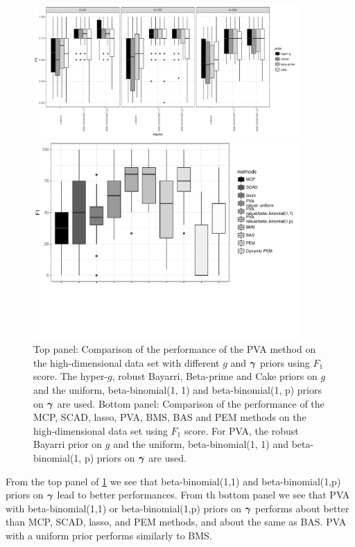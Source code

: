 \begin{figure}[p!]
	\begin{center}
		\includegraphics[width=0.9\textwidth]{./highDimPVA_F1.pdf}  
		
		\includegraphics[trim={0 4cm 0 0},width=0.9\textwidth]{./highDimPVA_F1_compare_edit.pdf} 
	\end{center}
	\caption{Top panel: Comparison of the performance of the PVA method on the
						high-dimensional data set with different $g$ and ${\boldsymbol \gamma}$ priors using $F_1$ score.
						The hyper-$g$,
						robust Bayarri, Beta-prime and Cake priors on $g$ and the uniform, beta-binomial(1, 1) and beta-binomial(1, p) priors on ${\boldsymbol \gamma}$ are used.
					Bottom panel: Comparison of the performance of the MCP, SCAD, lasso, PVA, BMS, BAS and PEM methods on the
					high-dimensional data set using $F_1$ score. For PVA, the
					robust Bayarri prior on $g$ and the uniform, beta-binomial(1, 1) and beta-binomial(1, p) priors
					on ${\boldsymbol \gamma}$ are used.}
	\label{fig:highDimPVA_F1}
\end{figure}

From the top panel of \ref{fig:highDimPVA_F1} we see that 
beta-binomial(1,1) and beta-binomial(1,p) priors on ${\boldsymbol \gamma}$
lead to better performances.
From th bottom panel we see that PVA 
with beta-binomial(1,1) or beta-binomial(1,p) priors on ${\boldsymbol \gamma}$
performs about better than MCP, SCAD, lasso, 
and PEM methods, and about the same as BAS.
PVA with a uniform prior performs similarly
to BMS.

